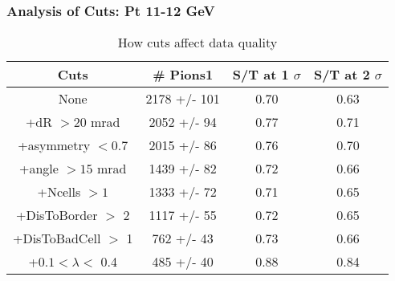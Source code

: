 \frame
{
\frametitle{Analysis of Cuts: Pt 11-12 GeV}
\begin{table}
\caption{How cuts affect data quality}
\centering
\begin{tabular}{c c c c}
\hline\hline
Cuts & \# Pions1 & S/T at 1 $\sigma$ & S/T at 2 $\sigma$ \\ [0.5ex]
\hline
None & 2178 +/-  101 & 0.70 & 0.63 \\ %
+dR $> 20$ mrad & 2052 +/-   94 & 0.77 & 0.71 \\ %
+asymmetry $< 0.7$ & 2015 +/-   86 & 0.76 & 0.70 \\ %
+angle $> 15$ mrad & 1439 +/-   82 & 0.72 & 0.66 \\ %
+Ncells $> 1$& 1333 +/-   72 & 0.71 & 0.65 \\ %
+DisToBorder $>$ 2 & 1117 +/-   55 & 0.72 & 0.65 \\ %
+DisToBadCell $>$ 1&  762 +/-   43 & 0.73 & 0.66 \\ %
+$0.1 < \lambda <$ 0.4 &  485 +/-   40 & 0.88 & 0.84 \\ %
[1ex]
\hline
\end{tabular}
\label{table:nonlin}
\end{table}
}
